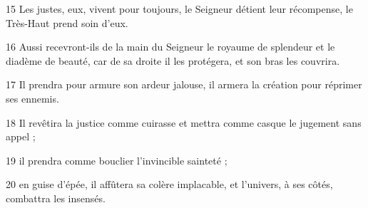 15 Les justes, eux, vivent pour toujours, le Seigneur détient leur récompense, le Très-Haut prend soin d’eux.

16 Aussi recevront-ils de la main du Seigneur le royaume de splendeur et le diadème de beauté, car de sa droite il les protégera, et son bras les couvrira.

17 Il prendra pour armure son ardeur jalouse, il armera la création pour réprimer ses ennemis.

18 Il revêtira la justice comme cuirasse et mettra comme casque le jugement sans appel ;

19 il prendra comme bouclier l’invincible sainteté ;

20 en guise d’épée, il affûtera sa colère implacable, et l’univers, à ses côtés, combattra les insensés.
